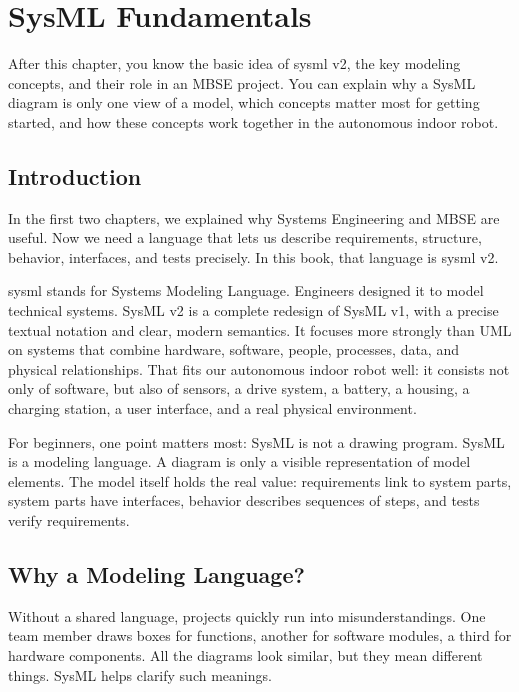 \chapter{SysML Fundamentals}

\begin{lernziele}
After this chapter, you know the basic idea of \gls{sysml} v2, the key modeling concepts, and their role in an MBSE project. You can explain why a SysML diagram is only one view of a model, which concepts matter most for getting started, and how these concepts work together in the autonomous indoor robot.
\end{lernziele}

\section{Introduction}
In the first two chapters, we explained why Systems Engineering and MBSE are useful. Now we need a language that lets us describe requirements, structure, behavior, interfaces, and tests precisely. In this book, that language is \gls{sysml} v2.

\gls{sysml} stands for Systems Modeling Language. Engineers designed it to model technical systems. SysML v2 is a complete redesign of SysML v1, with a precise textual notation and clear, modern semantics. It focuses more strongly than UML on systems that combine hardware, software, people, processes, data, and physical relationships. That fits our autonomous indoor robot well: it consists not only of software, but also of sensors, a drive system, a battery, a housing, a charging station, a user interface, and a real physical environment.

For beginners, one point matters most: SysML is not a drawing program. SysML is a modeling language. A diagram is only a visible representation of model elements. The model itself holds the real value: requirements link to system parts, system parts have interfaces, behavior describes sequences of steps, and tests verify requirements.

\section{Why a Modeling Language?}
Without a shared language, projects quickly run into misunderstandings. One team member draws boxes for functions, another for software modules, a third for hardware components. All the diagrams look similar, but they mean different things. SysML helps clarify such meanings.

